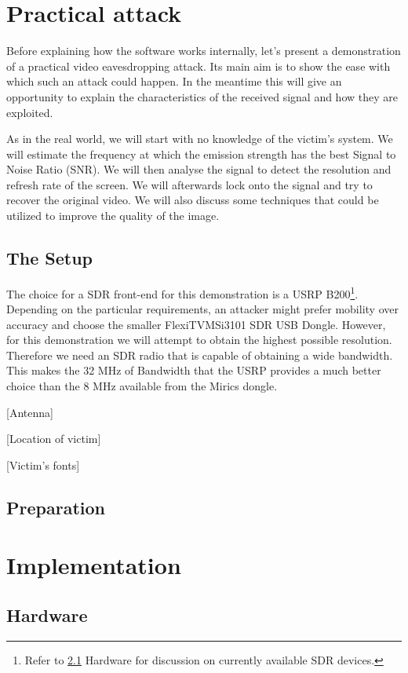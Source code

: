 \documentclass[a4paper,12pt,twoside,openright]{report}
\begin{document}
\chapter{Practical attack} 

Before explaining how the software works internally, let's present a demonstration of a practical video eavesdropping attack. Its main aim is to show the ease with which such an attack could happen. In the meantime this will give an opportunity to explain the characteristics of the received signal and how they are exploited.

As in the real world, we will start with no knowledge of the victim's system. We will estimate the frequency at which the emission strength has the best Signal to Noise Ratio (SNR). We will then analyse the signal to detect the resolution and refresh rate of the screen. We will afterwards lock onto the signal and try to recover the original video. We will also discuss some techniques that could be utilized to improve the quality of the image.

\section{The Setup}

The choice for a SDR front-end for this demonstration is a USRP B200\footnote{Refer to \ref{sec:hw} Hardware for discussion on currently available SDR devices.}. Depending on the particular requirements, an attacker might prefer mobility over accuracy and choose the smaller FlexiTV\texttrademark MSi3101 SDR USB Dongle. However, for this demonstration we will attempt to obtain the highest possible resolution. Therefore we need an SDR radio that is capable of obtaining a wide bandwidth. This makes the 32 MHz of Bandwidth that the USRP provides a much better choice than the 8 MHz available from the Mirics dongle.

[Antenna]

[Location of victim]

[Victim's fonts]

\section{Preparation}

\chapter{Implementation} 

\section{Hardware}
\label{sec:hw} 
\end{document}
